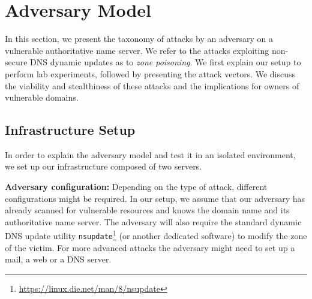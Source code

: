 \section{Adversary Model}

In this section, we present the taxonomy of attacks by an adversary on a vulnerable authoritative name server.
We refer to the attacks exploiting non-secure DNS dynamic updates as to \textit{zone poisoning}.
%
We first explain our setup to perform lab experiments, followed by 
presenting the attack vectors. 
We discuss the viability and stealthiness of these attacks and %
the implications for owners of vulnerable domains.


\subsection{Infrastructure Setup}

In order to explain the adversary model and test it in an isolated environment, we set up our infrastructure %
composed of two servers. 


\textbf{Adversary configuration:} Depending on the type of attack, different configurations might be required. 
In our setup, we assume that our adversary has already scanned for vulnerable 
resources and knows the domain name and its authoritative name server.
The adversary will also require the standard dynamic DNS update utility \texttt{nsupdate}\footnote{%
\url{https://linux.die.net/man/8/nsupdate}} (or another dedicated software) to modify the zone of the victim. %
For more advanced attacks the adversary might need to set up a mail, a web or a DNS server.

